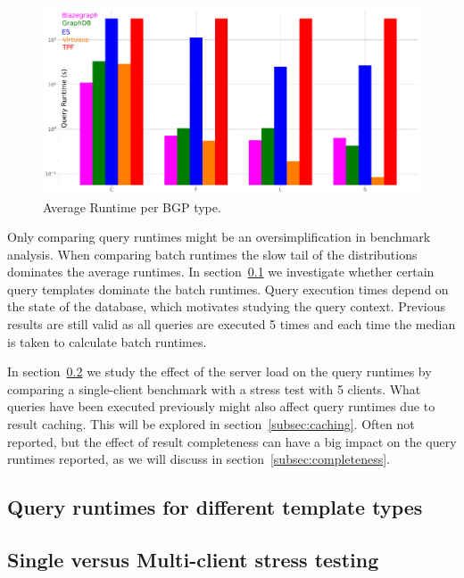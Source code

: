 \begin{figure}[htbp!]
	\centering
	\includegraphics[width=0.9\linewidth]{imgs/Fig06_WatdivTemplateTypes}
	\caption{Average Runtime per BGP type.}
	\label{fig:Fig06_WatdivTemplateTypes}
\end{figure}

Only comparing query runtimes might be an oversimplification in benchmark analysis. 
When comparing batch runtimes the slow tail of the distributions dominates the average runtimes. In section~\ref{subsec:templates} we investigate whether certain query templates dominate the batch runtimes.
Query execution times depend on the state of the database, which motivates studying the query context. Previous results are still valid as all queries are executed 5 times and each time the median is taken to calculate batch runtimes.

In section~\ref{subsec:load} we study the effect of the server load on the query runtimes by comparing a single-client benchmark with a stress test with 5 clients. What queries have been executed previously might also affect query runtimes due to result caching. This will be explored in section~\ref{subsec:caching}. Often not reported, but the effect of result completeness can have a big impact on the query runtimes reported, as we will discuss in section~\ref{subsec:completeness}.

\subsection{Query runtimes for different template types}
\label{subsec:templates}


\subsection{Single versus Multi-client stress testing}
\label{subsec:load}


